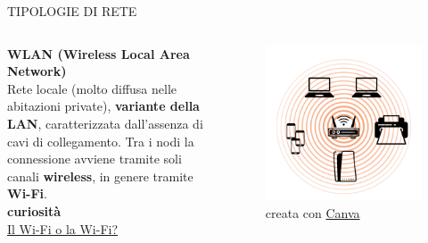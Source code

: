 \documentclass[aspectratio=1610, handout]{beamer}
\begin{document}
\begin{frame}{TIPOLOGIE DI RETE}
    \begin{columns}
            \justifying
            \textbf{WLAN (Wireless Local Area Network)} \\
            Rete locale (molto diffusa nelle abitazioni private), \textbf{variante della LAN}, caratterizzata 
            dall'assenza di cavi di collegamento. Tra i nodi la connessione avviene tramite soli canali \textbf{wireless},
            in genere tramite \textbf{Wi-Fi}.\\
            \bigskip
            \tiny{\textbf{curiosità}}\\
            \href{https://accademiadellacrusca.it/it/consulenza/il-wifi-o-la-wifi-limportante-alla-fine-\%C3\%A8-che-funzioni/1247}{Il Wi-Fi o la Wi-Fi?}
            \begin{figure}
                \includegraphics[width=\linewidth]{img/wlan.png}
                \caption{{creata con \href{https://www.canva.com/}{Canva}}}
            \end{figure}
    \end{columns}
\end{frame}
\end{document}
